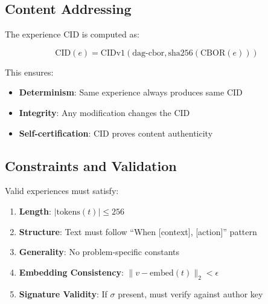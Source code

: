 \subsection{Content Addressing}

The experience CID is computed as:

\begin{equation}
\text{CID}(e) = \text{CIDv1}(\text{dag-cbor}, \text{sha256}(\text{CBOR}(e)))
\end{equation}

This ensures:
\begin{itemize}
    \item \textbf{Determinism}: Same experience always produces same CID
    \item \textbf{Integrity}: Any modification changes the CID
    \item \textbf{Self-certification}: CID proves content authenticity
\end{itemize}

\subsection{Constraints and Validation}

Valid experiences must satisfy:

\begin{enumerate}
    \item \textbf{Length}: $|\text{tokens}(t)| \leq 256$
    \item \textbf{Structure}: Text must follow ``When [context], [action]'' pattern
    \item \textbf{Generality}: No problem-specific constants
    \item \textbf{Embedding Consistency}: $\|v - \text{embed}(t)\|_2 < \epsilon$
    \item \textbf{Signature Validity}: If $\sigma$ present, must verify against author key
\end{enumerate}

